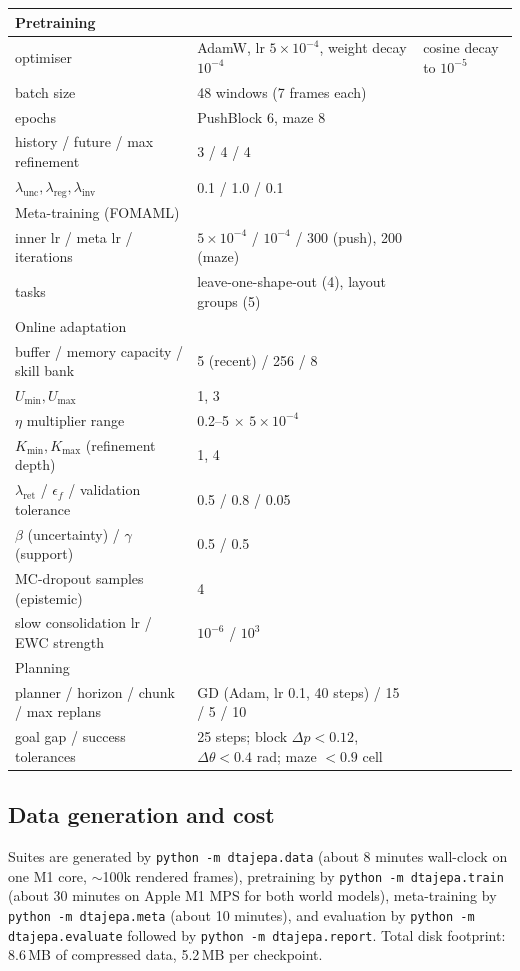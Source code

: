\begin{center}
\begin{tabular}{lll}
\toprule
Pretraining & & \\
\midrule
optimiser & AdamW, lr $5\times10^{-4}$, weight decay $10^{-4}$ & cosine decay to $10^{-5}$\\
batch size & 48 windows (7 frames each) & \\
epochs & PushBlock 6, maze 8 & \\
history / future / max refinement & 3 / 4 / 4 & \\
$\lambda_{\mathrm{unc}},\lambda_{\mathrm{reg}},\lambda_{\mathrm{inv}}$ & 0.1 / 1.0 / 0.1 & \\
\midrule
Meta-training (FOMAML) & & \\
\midrule
inner lr / meta lr / iterations & $5\times10^{-4}$ / $10^{-4}$ / 300 (push), 200 (maze) & \\
tasks & leave-one-shape-out (4), layout groups (5) & \\
\midrule
Online adaptation & & \\
\midrule
buffer / memory capacity / skill bank & 5 (recent) / 256 / 8 & \\
$U_{\min},U_{\max}$ & 1, 3 & \\
$\eta$ multiplier range & 0.2--5 $\times$ $5\times10^{-4}$ & \\
$K_{\min},K_{\max}$ (refinement depth) & 1, 4 & \\
$\lambda_{\mathrm{ret}}$ / $\epsilon_f$ / validation tolerance & 0.5 / 0.8 / 0.05 & \\
$\beta$ (uncertainty) / $\gamma$ (support) & 0.5 / 0.5 & \\
MC-dropout samples (epistemic) & 4 & \\
slow consolidation lr / EWC strength & $10^{-6}$ / $10^{3}$ & \\
\midrule
Planning & & \\
\midrule
planner / horizon / chunk / max replans & GD (Adam, lr 0.1, 40 steps) / 15 / 5 / 10 & \\
goal gap / success tolerances & 25 steps; block $\Delta p<0.12$, $\Delta\theta<0.4$ rad; maze $<0.9$ cell & \\
\bottomrule
\end{tabular}
\end{center}

\subsection{Data generation and cost}

Suites are generated by \texttt{python -m dtajepa.data} (about 8 minutes wall-clock on one M1
core, $\sim$100k rendered frames), pretraining by \texttt{python -m dtajepa.train} (about 30
minutes on Apple M1 MPS for both world models), meta-training by \texttt{python -m
dtajepa.meta} (about 10 minutes), and evaluation by \texttt{python -m dtajepa.evaluate}
followed by \texttt{python -m dtajepa.report}. Total disk footprint: 8.6\,MB of compressed
data, 5.2\,MB per checkpoint.
